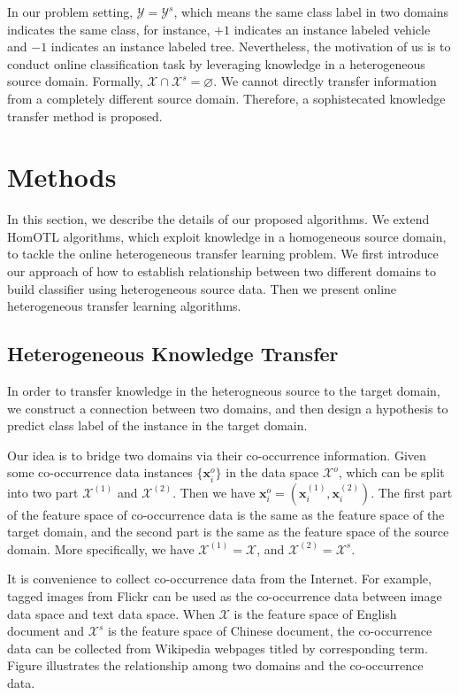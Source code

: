 \documentclass[letterpaper]{article}
\theoremstyle{remark}
\theoremstyle{definition}
\begin{document}
In our problem setting, $\mathcal{Y} = \mathcal{Y}^{s}$, which means the same class label in two domains indicates the same class, for instance, $+1$ indicates an instance labeled vehicle and $-1$ indicates an instance labeled tree.
Nevertheless, the motivation of us is to conduct online classification task by leveraging knowledge in a heterogeneous source domain.
Formally, $\mathcal{X} \cap \mathcal{X}^{s} = \varnothing$.
We cannot directly transfer information from a completely different source domain.
Therefore, a sophistecated knowledge transfer method is proposed.

\section{Methods}

In this section, we describe the details of our proposed algorithms.
We extend HomOTL algorithms, which exploit knowledge in a homogeneous source domain, to tackle the online heterogeneous transfer learning problem.
We first introduce our approach of how to establish relationship between two different domains to build classifier using heterogeneous source data.
Then we present online heterogeneous transfer learning algorithms.

\subsection{Heterogeneous Knowledge Transfer}

In order to transfer knowledge in the heterogneous source to the target domain, we construct a connection between two domains, and then design a hypothesis to predict class label of the instance in the target domain.

Our idea is to bridge two domains via their co-occurrence information.
Given some co-occurrence data instances $\{ \mathbf{x}_{i}^{o} \}$ in the data space $\mathcal{X}^o$, which can be split into two part $\mathcal{X}^{(1)}$ and $\mathcal{X}^{(2)}$.
Then we have $ \mathbf{x}_{i}^{o} = (\mathbf{x}_{i}^{(1)}, \mathbf{x}_{i}^{(2)}) $.
The first part of the feature space of co-occurrence data is the same as the feature space of the target domain, and the second part is the same as the feature space of the source domain.
More specifically, we have $\mathcal{X}^{(1)} = \mathcal{X}$, and $\mathcal{X}^{(2)} = \mathcal{X}^s$.

It is convenience to collect co-occurrence data from the Internet.
For example, tagged images from Flickr can be used as the co-occurrence data between image data space and text data space.
When $\mathcal{X}$ is the feature space of English document and $\mathcal{X}^s$ is the feature space of Chinese document, the co-occurrence data can be collected from Wikipedia webpages titled by corresponding term.
Figure illustrates the relationship among two domains and the co-occurrence data.
\end{document}
